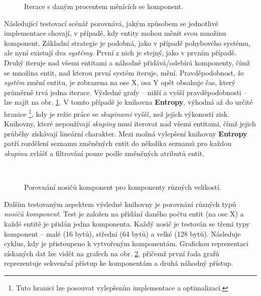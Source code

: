 \begin{figure}[H]
	\begin{center}
	\end{center}
	\caption{Iterace s daným procentem měnících se komponent.}
	\label{Fig:EVALAdvMovSys}
\end{figure}

Následující testovací scénář porovnává, jakým způsobem se jednotlivé implementace chovají, v případě, kdy entity mohou měnit svou množinu komponent. Základní strategie je podobná, jako v případě pohybového systému, ale nyní existují dva \emph{systémy}. První z nich je stejný, jako v prvním případě. Druhý iteruje nad všemi entitami a náhodně přidává/odebírá komponenty, čímž se množina entit, nad kterou první systém iteruje, mění. Pravděpodobnost, že \emph{systém} změní entitu, je zobrazena na ose X, osa Y opět obsahuje čas, který průměrně trvá jedna iterace. Výsledné grafy -- nižší a  vyšší pravděpodobnosti -- lze najít na obr. \ref{Fig:EVALAdvMovSys}. V tomto případě je knihovna \textbf{Entropy}, výhodná až do určité hranice \footnote{Tuto hranici lze posouvat vylepšením implementace a optimalizací.}, kdy je režie práce se \emph{skupinami} vyšší, než jejich výkoností zisk. Knihovny, které nepoužívají \emph{skupiny} musí iterovat nad všemi entitami, čímž jejich průběhy získávají lineární charakter. Mezi možná vylepšení knihovny \textbf{Entropy} patří rozdělení seznamu změněných entit do několika seznamů pro každou \emph{skupinu} zvlášť a filtrování pouze podle změněných atributů entit.

\begin{figure}[H]
	\begin{center}
		 \\
	\end{center}
	\caption{Porovnání nosičů komponent pro komponenty různých velikostí.}
	\label{Fig:EVALHolders}
\end{figure}

Dalším testovaným aspektem výsledné knihovny je porovnání různých typů \emph{nosičů komponent}. Test je založen na přidání daného počtu entit (na ose X) a každé entitě je přidán jedna komponenta. Každý nosič je testován se třemi typy komponent -- malé (16 bytů), střední (64 bytů) a velké (128 bytů). Následuje cyklus, kdy je přistoupeno k vytvořeným komponentám. Grafickou reprezentaci získaných dat lze vidět na grafech na obr. \ref{Fig:EVALHolders}, přičemž první řada grafů reprezentuje sekvenční přístup ke komponentám a druhá náhodný přístup. 


